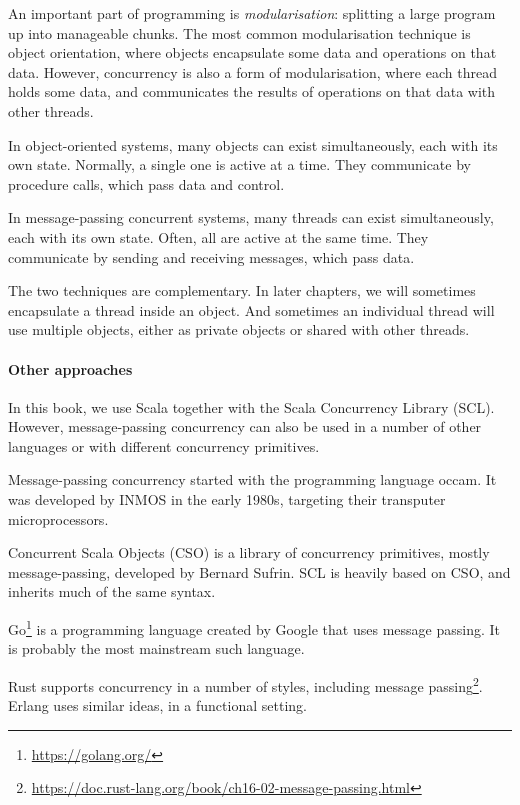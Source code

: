 An important part of programming is \emph{modularisation}: splitting a large
program up into manageable chunks.  The most common modularisation technique
is object orientation, where objects encapsulate some data and operations on
that data.  However, concurrency is also a form of modularisation, where each
thread holds some data, and communicates the results of operations on that
data with other threads.

In object-oriented systems, many objects can exist simultaneously, each with
its own state.  Normally, a single one is active at a time.  They communicate
by procedure calls, which pass data and control.

In message-passing concurrent systems, many threads can exist simultaneously,
each with its own state.  Often, all are active at the same time.  They
communicate by sending and receiving messages, which pass data.

The two techniques are complementary.  In later chapters, we will sometimes
encapsulate a thread inside an object.  And sometimes an individual thread
will use multiple objects, either as private objects or shared with other
threads. 


\paragraph{Other approaches}

In this book, we use Scala together with the Scala Concurrency Library (SCL).
However, message-passing concurrency can also be used in a number of other
languages or with different concurrency primitives.

Message-passing concurrency started with the programming language {\sf occam}.
It was developed by INMOS in the early 1980s, targeting their transputer
microprocessors.

Concurrent Scala Objects (CSO) is a library of concurrency primitives, mostly
message-passing, developed by Bernard Sufrin.  SCL is heavily based on CSO,
and inherits much of the same syntax.  

Go\footnote{\url{https://golang.org/}} is a programming language created
by Google that uses message passing.  It is probably the most
mainstream such language.


Rust supports concurrency in a number of styles, including message
  passing\footnote{%
    \url{https://doc.rust-lang.org/book/ch16-02-message-passing.html}}. 
Erlang uses similar ideas, in a functional setting.

